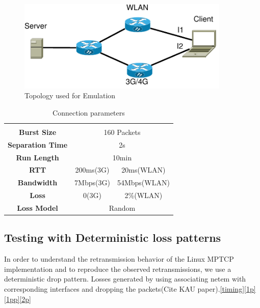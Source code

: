 \documentclass[12pt,draftcls,onecolumn]{IEEEtran}
\begin{document}
\begin{figure}[!ht]
\begin{center}
\includegraphics[angle=0, width=0.9\textwidth]{images/fortest.pdf}
\caption{Topology used for Emulation}\label{fig1}
\end{center}
\end{figure}
\begin{center}

\begin{table}
\begin{center}
\begin{tabular}{|c|cccccccccc|}
      \hline
      \multicolumn{1}{c}{} & & \\[\dimexpr-\normalbaselineskip-\arrayrulewidth]
      \textbf{Burst Size} & \multicolumn{10}{c|}{160 Packets} \\
      \hline
      \textbf{Separation Time} & \multicolumn{10}{c|}{2s} \\
      \hline

      \textbf{Run Length} & \multicolumn{10}{c|}{10min}\\
      \hline 	
      \textbf{RTT} & \multicolumn{5}{c|}{200ms(3G)} & \multicolumn{5}{c|}{20ms(WLAN)} \\
      \hline 	
      \textbf{Bandwidth} & \multicolumn{5}{c|}{7Mbps(3G)} & \multicolumn{5}{c|}{54Mbps(WLAN)} \\
      \hline
      \textbf{Loss} & \multicolumn{5}{c|}{0(3G)} & \multicolumn{5}{c|}{2\%(WLAN)} \\
      \hline
      \textbf{Loss Model} & \multicolumn{10}{c|}{Random}\\
      \hline
\end{tabular}
\caption{Connection parameters}\label{tab1}
\end{center}
\end{table}
\end{center}


\subsection{Testing with Deterministic loss patterns}
In order to understand the retransmission behavior of the Linux MPTCP implementation and to reproduce the observed retransmissions, we use a deterministic drop pattern.
Losses generated by using associating netem with corresponding interfaces and dropping the packets(Cite KAU paper).\ref{timing}\ref{1p}\ref{1pp}\ref{2p} 
 
\end{document}
